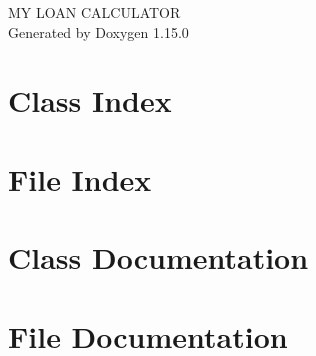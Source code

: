 \documentclass[twoside]{book}
\newcommand{\+}{\discretionary{\mbox{\scriptsize$\hookleftarrow$}}{}{}}
\newcommand{\clearemptydoublepage}{%
    \newpage{\pagestyle{empty}\cleardoublepage}%
  }
\begin{document}
  \raggedbottom
    \hypersetup{pageanchor=false,
                bookmarksnumbered=true,
                pdfencoding=unicode
               }
  \begin{titlepage}
  \vspace*{7cm}
  \begin{center}%
  {\Large MY LOAN CALCULATOR}\\
  \vspace*{1cm}
  {\large Generated by Doxygen 1.15.0}\\
  \end{center}
  \end{titlepage}
  \clearemptydoublepage
  \tableofcontents
  \clearemptydoublepage
  \hypersetup{pageanchor=true}
\chapter{Class Index}

\chapter{File Index}

\chapter{Class Documentation}

\chapter{File Documentation}

  \backmatter
  \newpage
  \clearemptydoublepage
  \printindex
\end{document}
